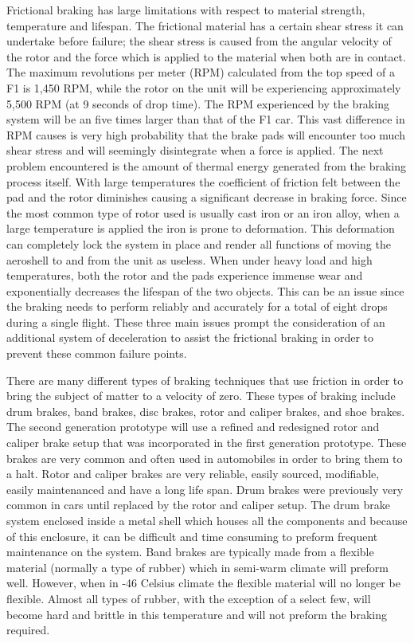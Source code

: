 \indent\indent Frictional braking has large limitations with respect to material strength, temperature and lifespan. The frictional material has a certain shear stress it can undertake before failure; the shear stress is caused from the angular velocity of the rotor and the force which is applied to the material when both are in contact. The maximum revolutions per meter (RPM) calculated from the top speed of a F1 is 1,450 RPM, while the rotor on the unit will be experiencing  approximately 5,500 RPM (at 9 seconds of drop time). The RPM experienced by the braking system will be an five times larger than that of the F1 car. This vast difference in RPM causes is very high probability that the brake pads will encounter too much shear stress and will seemingly disintegrate when a force is applied. The next problem encountered is the amount of thermal energy generated from the braking process itself. With large temperatures the coefficient of friction felt between the pad and the rotor diminishes causing a significant decrease in braking force. Since the most common type of rotor used is usually cast iron or an iron alloy, when a large temperature is applied the iron is prone to deformation. This deformation can completely lock the system in place and render all functions of moving the aeroshell to and from the unit as useless. When under heavy load and high temperatures, both the rotor and the pads experience immense wear and exponentially decreases the lifespan of the two objects. This can be an issue since the braking needs to perform reliably and accurately for a total of eight drops during a single flight. These three main issues prompt the consideration of an additional system of deceleration to assist the frictional braking in order to prevent these common failure points.

\indent\indent There are many different types of braking techniques that use friction in order to bring the subject of matter to a velocity of zero. These types of braking include drum brakes, band brakes, disc brakes, rotor and caliper brakes, and shoe brakes. The second generation prototype will use a refined and redesigned rotor and caliper brake setup that was incorporated in the first generation prototype. These brakes are very common and often used in automobiles in order to bring them to a halt. Rotor and caliper brakes are very reliable, easily sourced, modifiable, easily maintenanced and have a long life span. Drum brakes were previously very common in cars until replaced by the rotor and caliper setup. The drum brake system enclosed inside a metal shell which houses all the components and because of this enclosure, it can be difficult and time consuming to preform frequent maintenance on the system. Band brakes are typically made from a flexible material (normally a type of rubber) which in semi-warm climate will preform well. However, when in -46 \degree Celsius climate the flexible material will no longer be flexible. Almost all types of rubber, with the exception of a select few, will become hard and brittle in this temperature and will not preform the braking required.

